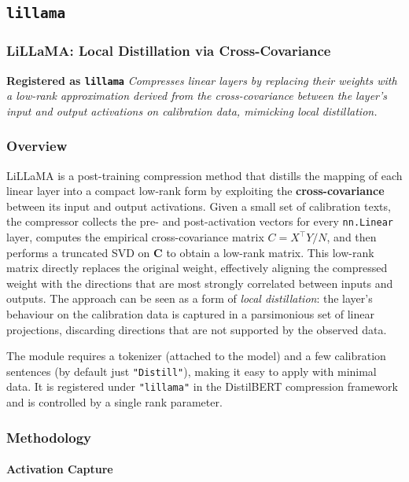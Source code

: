 \subsection{\texttt{lillama}}
\subsubsection*{LiLLaMA: Local Distillation via Cross-Covariance}

\textbf{Registered as \texttt{lillama}}
\textit{Compresses linear layers by replacing their weights with a low-rank approximation derived from the cross-covariance between the layer's input and output activations on calibration data, mimicking local distillation.}


\subsubsection*{Overview}

LiLLaMA is a post-training compression method that distills the mapping of each linear layer into a compact low-rank form by exploiting the \textbf{cross-covariance} between its input and output activations. Given a small set of calibration texts, the compressor collects the pre- and post-activation vectors for every \texttt{nn.Linear} layer, computes the empirical cross-covariance matrix $C = X^\top Y / N$, and then performs a truncated SVD on \textbf{C} to obtain a low-rank matrix. This low-rank matrix directly replaces the original weight, effectively aligning the compressed weight with the directions that are most strongly correlated between inputs and outputs. The approach can be seen as a form of \textit{local distillation}: the layer's behaviour on the calibration data is captured in a parsimonious set of linear projections, discarding directions that are not supported by the observed data.

The module requires a tokenizer (attached to the model) and a few calibration sentences (by default just \texttt{"Distill"}), making it easy to apply with minimal data. It is registered under \texttt{"lillama"} in the DistilBERT compression framework and is controlled by a single rank parameter.


\subsubsection*{Methodology}

\paragraph{Activation Capture}

